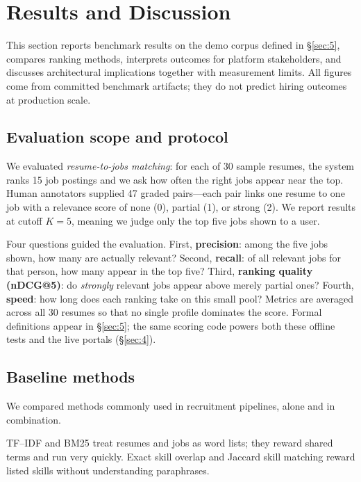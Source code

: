 \section{Results and Discussion}\label{sec:6}

This section reports benchmark results on the demo corpus defined in \S\ref{sec:5}, compares ranking methods, interprets outcomes for platform stakeholders, and discusses architectural implications together with measurement limits.
All figures come from committed benchmark artifacts; they do not predict hiring outcomes at production scale.

\subsection{Evaluation scope and protocol}\label{sec:6-evaluated}

We evaluated \emph{resume-to-jobs matching}: for each of 30 sample resumes, the system ranks 15 job postings and we ask how often the right jobs appear near the top.
Human annotators supplied 47 graded pairs---each pair links one resume to one job with a relevance score of none (0), partial (1), or strong (2).
We report results at cutoff $K{=}5$, meaning we judge only the top five jobs shown to a user.

Four questions guided the evaluation.
First, \textbf{precision}: among the five jobs shown, how many are actually relevant?
Second, \textbf{recall}: of all relevant jobs for that person, how many appear in the top five?
Third, \textbf{ranking quality (nDCG@5)}: do \emph{strongly} relevant jobs appear above merely partial ones?
Fourth, \textbf{speed}: how long does each ranking take on this small pool?
Metrics are averaged across all 30 resumes so that no single profile dominates the score.
Formal definitions appear in \S\ref{sec:5}; the same scoring code powers both these offline tests and the live portals (\S\ref{sec:4}).

\subsection{Baseline methods}\label{sec:6-baselines}\label{sec:6-comparison}

We compared methods commonly used in recruitment pipelines, alone and in combination.

TF--IDF and BM25 treat resumes and jobs as word lists; they reward shared terms and run very quickly.
Exact skill overlap and Jaccard skill matching reward listed skills without understanding paraphrases.

